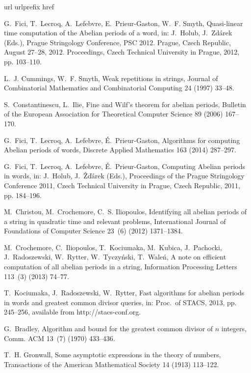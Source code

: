 \documentclass[3p]{elsarticle}
\begin{document}
\begin{thebibliography}{10}
\expandafter\ifx\csname url\endcsname\relax
  \def\url#1{\texttt{#1}}\fi
\expandafter\ifx\csname urlprefix\endcsname\relax\def\urlprefix{URL }\fi
\expandafter\ifx\csname href\endcsname\relax
  \def\href#1#2{#2} \def\path#1{#1}\fi

G.~Fici, T.~Lecroq, A.~Lefebvre, E.~Prieur-Gaston, W.~F. Smyth, Quasi-linear
  time computation of the {A}belian periods of a word, in: J.~Holub,
  J.~Zd{\'a}rek (Eds.), Prague Stringology Conference, {PSC} 2012. Prague,
  Czech Republic, August 27--28, 2012. Proceedings, Czech Technical University
  in Prague, 2012, pp. 103--110.

L.~J. Cummings, W.~F. Smyth, Weak repetitions in strings, {Journal of
  Combinatorial Mathematics and Combinatorial Computing} 24 (1997) 33--48.

S.~Constantinescu, L.~Ilie, {F}ine and {W}ilf's theorem for abelian periods,
  Bulletin of the European Association for Theoretical Computer Science 89
  (2006) 167--170.

G.~Fici, T.~Lecroq, A.~Lefebvre, {\'{E}}.~Prieur-Gaston, Algorithms for
  computing {A}belian periods of words, Discrete Applied Mathematics 163 (2014)
  287--297.

G.~Fici, T.~Lecroq, A.~Lefebvre, {\'{E}}.~Prieur-Gaston, Computing {A}belian
  periods in words, in: J.~Holub, J.~{\v{Z}}{\v{d}}{\'{a}}rek (Eds.),
  Proceedings of the Prague Stringology Conference 2011, Czech Technical
  University in Prague, Czech Republic, 2011, pp. 184--196.

M.~Christou, M.~Crochemore, C.~S. Iliopoulos, Identifying all abelian periods
  of a string in quadratic time and relevant problems, International Journal of
  Foundations of Computer Science 23~(6) (2012) 1371--1384.

M.~Crochemore, C.~Iliopoulos, T.~Kociumaka, M.~Kubica, J.~Pachocki,
  J.~Radoszewski, W.~Rytter, W.~Tyczy\'nski, T.~Wale\'n, A note on efficient
  computation of all abelian periods in a string, Information Processing
  Letters 113~(3) (2013) 74--77.

T.~Kociumaka, J.~Radoszewski, W.~Rytter, Fast algorithms for abelian periods in
  words and greatest common divisor queries, in: Proc.~of {STACS}, 2013, pp.
  245--256, available from http://stacs-conf.org.

G.~Bradley, Algorithm and bound for the greatest common divisor of $n$
  integers, Comm. ACM 13~(7) (1970) 433--436.

T.~H. Gronwall, Some asymptotic expressions in the theory of numbers,
  Transactions of the American Mathematical Society 14 (1913) 113--122.

\end{thebibliography}
\end{document}

